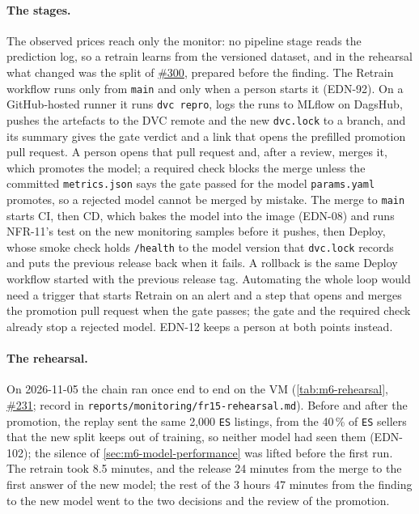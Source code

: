 \paragraph{The stages.}
The observed prices reach only the monitor: no pipeline stage reads the prediction log, so a retrain learns from the versioned dataset, and in the rehearsal what changed was the split of \href{https://github.com/mlops-2627q1-mds-upc/MLOPS_Recommenditos/pull/300}{\#300}, prepared before the finding.
The Retrain workflow runs only from \texttt{main} and only when a person starts it (EDN-92).
On a GitHub-hosted runner it runs \texttt{dvc repro}, logs the runs to MLflow on DagsHub, pushes the artefacts to the DVC remote and the new \texttt{dvc.lock} to a branch, and its summary gives the gate verdict and a link that opens the prefilled promotion pull request.
A person opens that pull request and, after a review, merges it, which promotes the model; a required check blocks the merge unless the committed \texttt{metrics.json} says the gate passed for the model \texttt{params.yaml} promotes, so a rejected model cannot be merged by mistake.
The merge to \texttt{main} starts CI, then CD, which bakes the model into the image (EDN-08) and runs NFR-11's test on the new monitoring samples before it pushes, then Deploy, whose smoke check holds \texttt{/health} to the model version that \texttt{dvc.lock} records and puts the previous release back when it fails.
A rollback is the same Deploy workflow started with the previous release tag.
Automating the whole loop would need a trigger that starts Retrain on an alert and a step that opens and merges the promotion pull request when the gate passes; the gate and the required check already stop a rejected model.
EDN-12 keeps a person at both points instead.

\paragraph{The rehearsal.}
On 2026-11-05 the chain ran once end to end on the VM (\cref{tab:m6-rehearsal}, \href{https://github.com/mlops-2627q1-mds-upc/MLOPS_Recommenditos/issues/231}{\#231}; record in \texttt{reports/monitoring/fr15-rehearsal.md}).
Before and after the promotion, the replay sent the same 2,000 \texttt{ES} listings, from the 40\,\% of \texttt{ES} sellers that the new split keeps out of training, so neither model had seen them (EDN-102); the silence of \cref{sec:m6-model-performance} was lifted before the first run.
The retrain took 8.5 minutes, and the release 24 minutes from the merge to the first answer of the new model; the rest of the 3 hours 47 minutes from the finding to the new model went to the two decisions and the review of the promotion.

